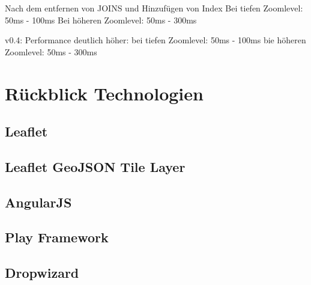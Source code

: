 Nach dem entfernen von JOINS und Hinzufügen von Index
Bei tiefen Zoomlevel:
50ms - 100ms
Bei höheren Zoomlevel:
50ms - 300ms

v0.4:
Performance deutlich höher:
bei tiefen Zoomlevel:
50ms - 100ms
bie höheren Zoomlevel:
50ms - 300ms

\section{Rückblick Technologien}
\subsection*{Leaflet}
\subsection*{Leaflet GeoJSON Tile Layer}
\subsection*{AngularJS}
\subsection*{Play Framework}
\subsection*{Dropwizard}